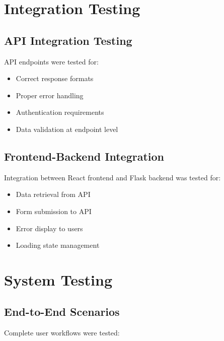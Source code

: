 \section{Integration Testing}

\subsection{API Integration Testing}

API endpoints were tested for:

\begin{itemize}
    \item Correct response formats
    \item Proper error handling
    \item Authentication requirements
    \item Data validation at endpoint level
\end{itemize}

\subsection{Frontend-Backend Integration}

Integration between React frontend and Flask backend was tested for:

\begin{itemize}
    \item Data retrieval from API
    \item Form submission to API
    \item Error display to users
    \item Loading state management
\end{itemize}

\section{System Testing}

\subsection{End-to-End Scenarios}

Complete user workflows were tested:

